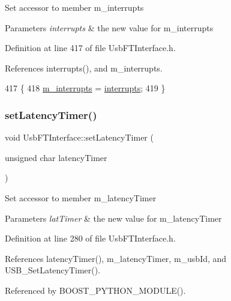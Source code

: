 Set accessor to member m\+\_\+interrupts 
\begin{DoxyParams}{Parameters}
{\em interrupts} & the new value for m\+\_\+interrupts \\
\hline
\end{DoxyParams}


Definition at line 417 of file Usb\+F\+T\+Interface.\+h.



References interrupts(), and m\+\_\+interrupts.


\begin{DoxyCode}
417                                        \{
418     \hyperlink{classUsbFTInterface_a0a6e3a781ead9833a413e230c6f8d1f4}{m\_interrupts} = \hyperlink{classUsbFTInterface_a1831ba02d9707ded902af4cb1df8863f}{interrupts};
419   \}
\end{DoxyCode}
\mbox{\label{classUsbFTInterface_abe0147f74ac414d0bd2cb4a7a81024b9}} 
\subsubsection{\texorpdfstring{set\+Latency\+Timer()}{setLatencyTimer()}}
{\footnotesize\ttfamily void Usb\+F\+T\+Interface\+::set\+Latency\+Timer (\begin{DoxyParamCaption}\item[{unsigned char}]{latency\+Timer }\end{DoxyParamCaption})\hspace{0.3cm}{\ttfamily [inline]}}

Set accessor to member m\+\_\+latency\+Timer 
\begin{DoxyParams}{Parameters}
{\em lat\+Timer} & the new value for m\+\_\+latency\+Timer \\
\hline
\end{DoxyParams}


Definition at line 280 of file Usb\+F\+T\+Interface.\+h.



References latency\+Timer(), m\+\_\+latency\+Timer, m\+\_\+usb\+Id, and U\+S\+B\+\_\+\+Set\+Latency\+Timer().



Referenced by B\+O\+O\+S\+T\+\_\+\+P\+Y\+T\+H\+O\+N\+\_\+\+M\+O\+D\+U\+L\+E().



